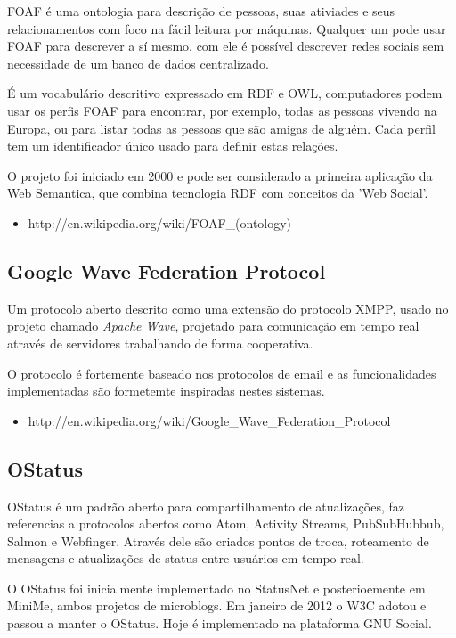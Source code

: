 \documentclass[12pt]{article}
\begin{document}
FOAF é uma ontologia para descrição de pessoas, suas ativiades e seus
relacionamentos com foco na fácil leitura por máquinas. Qualquer um pode usar
FOAF para descrever a sí mesmo, com ele é possível descrever redes sociais sem
necessidade de um banco de dados centralizado.

É um vocabulário descritivo expressado em RDF e OWL, computadores podem
usar os perfis FOAF para encontrar, por exemplo, todas as pessoas vivendo na
Europa, ou para listar todas as pessoas que são amigas de alguém. Cada perfil
tem um identificador único usado para definir estas relações.

O projeto foi iniciado em 2000 e pode ser considerado a primeira aplicação da
Web Semantica, que combina tecnologia RDF com conceitos da 'Web Social'.

\begin{itemize}
  \item http://en.wikipedia.org/wiki/FOAF\_(ontology)
\end{itemize}

\subsection{Google Wave Federation Protocol}

Um protocolo aberto descrito como uma extensão do protocolo XMPP\cite{xmpp},
usado no projeto chamado {\it Apache Wave}\cite{wave}, projetado para
comunicação em tempo real através de servidores trabalhando de forma
cooperativa.

O protocolo é fortemente baseado nos protocolos de email e as funcionalidades
implementadas são formetemte inspiradas nestes sistemas.

\begin{itemize}
  \item http://en.wikipedia.org/wiki/Google\_Wave\_Federation\_Protocol
\end{itemize}

\subsection{OStatus}

OStatus é um padrão aberto para compartilhamento de atualizações, faz
referencias a protocolos abertos como Atom, Activity Streams, PubSubHubbub,
Salmon e Webfinger. Através dele são criados pontos de troca, roteamento de
mensagens e atualizações de status entre usuários em tempo real.

O OStatus foi inicialmente implementado no StatusNet e posterioemente em
MiniMe, ambos projetos de microblogs. Em janeiro de 2012 o W3C adotou e passou a
manter o OStatus. Hoje é implementado na plataforma GNU Social.
\end{document}

